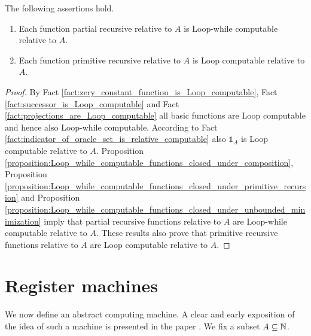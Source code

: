 \documentclass[10pt]{amsart}
\begin{document}
\begin{corollary}\label{corollary:partial_recursive_are_Loop_while_computable_and_primitive_recursive_functions_are_Loop_computable}
	The following assertions hold.
	\begin{enumerate}[label=\emph{\textbf{(\arabic*)}}, leftmargin=3.0em]
		\item Each function partial recursive relative to $A$ is Loop-while computable relative to $A$.
		\item Each function primitive recursive relative to $A$ is Loop computable relative to $A$.
	\end{enumerate}
\end{corollary}
\begin{proof}
	By Fact \ref{fact:zery_constant_function_is_Loop_computable}, Fact \ref{fact:successor_is_Loop_computable} and Fact \ref{fact:projections_are_Loop_computable} all basic functions are Loop computable and hence also Loop-while computable. According to Fact \ref{fact:indicator_of_oracle_set_is_relative_computable} also $\mathbb{1}_A$ is Loop computable relative to $A$. Proposition \ref{proposition:Loop_while_computable_functions_closed_under_composition}, Proposition \ref{proposition:Loop_while_computable_functions_closed_under_primitive_recursion} and Proposition \ref{proposition:Loop_while_computable_functions_closed_under_unbounded_minimization} imply that partial recursive functions relative to $A$ are Loop-while computable relative to $A$. These results also prove that primitive recursive functions relative to $A$ are Loop computable relative to $A$.
\end{proof}

\section{Register machines}
\noindent
We now define an abstract computing machine. A clear and early exposition of the idea of such a machine is presented in the paper \cite{lambek1961program}. We fix a subset $A \subseteq {\mathbb N}$.
\end{document}
